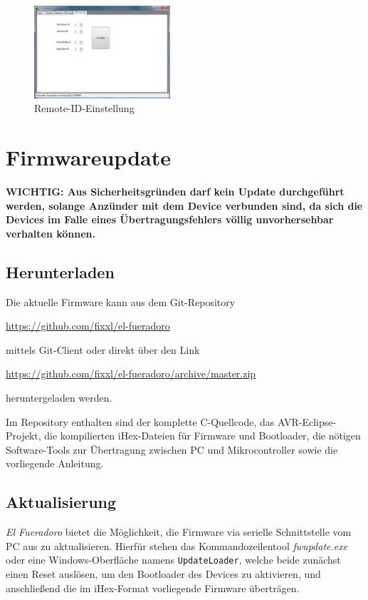 \documentclass[paper=a4, parskip, numbers=noenddot, toc=listof, headsepline]{scrbook}
\newcommand{\anlage}{\emph{El Fueradoro}}
\begin{document}
			\begin{figure}[!t]
				\centering
				\includegraphics[width=0.45\textwidth]{bilder/gui-remote}
				\caption{Remote-ID-Einstellung}
				\label{fig:gui-remote}
			\end{figure}

		\section{Firmwareupdate}
			\label{ch:firmwareupdate}

			\textbf{WICHTIG: Aus Sicherheitsgründen darf kein Update durchgeführt werden, solange Anzünder mit dem Device verbunden sind, da sich die Devices im Falle eines Übertragungsfehlers völlig unvorhersehbar verhalten können.}

			\subsection{Herunterladen}

				Die aktuelle Firmware kann aus dem Git-Repository
				\begin{center}
					\url{https://github.com/fixxl/el-fueradoro}
				\end{center}
				mittels Git-Client oder direkt über den Link
				\begin{center}
					\url{https://github.com/fixxl/el-fueradoro/archive/master.zip}
				\end{center}
				heruntergeladen werden.

				Im Repository enthalten sind der komplette C-Quellcode, das AVR-Eclipse-Projekt, die kom\-pilierten iHex-Dateien für Firmware und Bootloader, die nötigen Software-Tools zur Übertragung zwischen PC und Mikrocontroller sowie die vorliegende Anleitung.

			\subsection{Aktualisierung}

					{\anlage} bietet die Möglichkeit, die Firmware via serielle Schnittstelle vom PC aus zu aktualisieren. Hierfür stehen das Kommandozeilentool \emph{fwupdate.exe} oder eine Windows-Oberfläche namens \texttt{UpdateLoader}, welche beide zunächst einen Reset auslösen, um den Bootloader des Devices zu aktivieren, und anschließend die im iHex-Format vorliegende Firmware überträgen.
\end{document}
